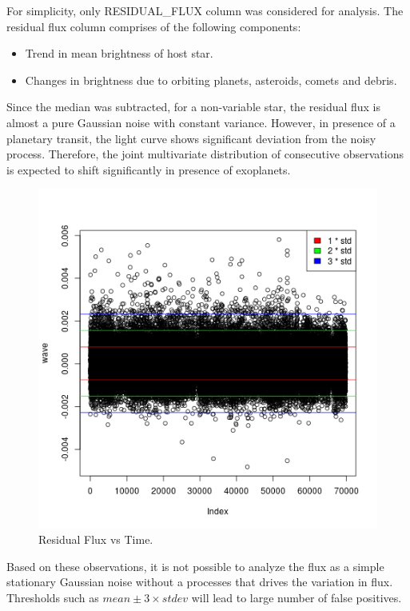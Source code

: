 \documentclass[%
aip,
amsmath,amssymb,
reprint,%
]{revtex4-1}
\begin{document}
For simplicity, only RESIDUAL\_FLUX column was considered for analysis. The residual flux column comprises of the following components:

\begin{itemize}
  \item Trend in mean brightness of host star.
  \item Changes in brightness due to orbiting planets, asteroids, comets and debris.
\end{itemize}

Since the median was subtracted, for a non-variable star, the residual flux is almost a pure Gaussian noise with constant variance. However, in presence of a planetary transit, the light curve shows significant deviation from the noisy process. Therefore, the joint multivariate distribution of consecutive observations is expected to shift significantly in presence of exoplanets.


\begin{figure}[h!]
	\includegraphics[width=\linewidth]{example.png}
	\caption{Residual Flux vs Time.}
	\label{fig:res_flux}
\end{figure}

Based on these observations, it is not possible to analyze the flux as a simple stationary Gaussian noise without a processes that drives the variation in flux. Thresholds such as $mean \pm 3 \times stdev$ will lead to large number of false positives.
\end{document}
